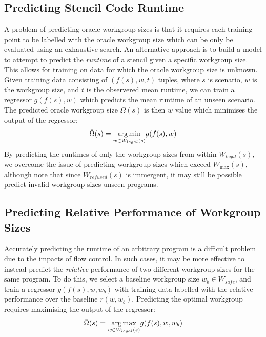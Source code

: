 % 


\subsection{Predicting Stencil Code Runtime}\label{subsec:omnitune-ml-runtime}

A problem of predicting oracle workgroup sizes is that it requires
each training point to be labelled with the oracle workgroup size
which can be only be evaluated using an exhaustive search. An
alternative approach is to build a model to attempt to predict the
\emph{runtime} of a stencil given a specific workgroup size. This
allows for training on data for which the oracle workgroup size is
unknown. Given training data consisting of $(f(s),w,t)$ tuples, where
$s$ is scenario, $w$ is the workgroup size, and $t$ is the observered
mean runtime, we can train a regressor $g(f(s), w)$ which predicts the
mean runtime of an unseen scenario. The predicted oracle workgroup
size $\bar{\Omega}(s)$ is then $w$ value which minimises the output of
the regressor:
%
\begin{equation}
  \bar{\Omega}(s) = \underset{w \in W_{legal}(s)}{\operatorname*{arg\,min}} g(f(s), w)
\end{equation}
%
By predicting the runtimes of only the workgroup sizes from within
$W_{legal}(s)$, we overcome the issue of predicting workgroup sizes
which exceed $W_{\max}(s)$, although note that since $W_{refused}(s)$
is immergent, it may still be possible predict invalid workgroup sizes
unseen programs.

% 

\subsection{Predicting Relative Performance of Workgroup Sizes}\label{subsec:omnitune-ml-speedup}

Accurately predicting the runtime of an arbitrary program is a
difficult problem due to the impacts of flow control. In such cases,
it may be more effective to instead predict the \emph{relative}
performance of two different workgroup sizes for the same program. To
do this, we select a baseline workgroup size $w_b \in W_{safe}$, and
train a regressor $g(f(s),w,w_b)$ with training data labelled with the
relative performance over the baseline $r(w, w_b)$. Predicting the
optimal workgroup requires maximising the output of the regressor:
%
\begin{equation}
  \bar{\Omega}(s) = \underset{w \in W_{legal}(s)}{\operatorname*{arg\,max}} g(f(s),w,w_b)
\end{equation}
%

